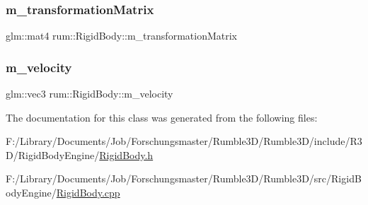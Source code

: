 \mbox{\label{classrum_1_1_rigid_body_ad3a0b17141b70e55f03a713f3892100e}} 
\subsubsection{\texorpdfstring{m\+\_\+transformation\+Matrix}{m\_transformationMatrix}}
{\footnotesize\ttfamily glm\+::mat4 rum\+::\+Rigid\+Body\+::m\+\_\+transformation\+Matrix\hspace{0.3cm}{\ttfamily [protected]}}

\mbox{\label{classrum_1_1_rigid_body_a48ac9b6ee9e5b953e811b9d53b5152c4}} 
\subsubsection{\texorpdfstring{m\+\_\+velocity}{m\_velocity}}
{\footnotesize\ttfamily glm\+::vec3 rum\+::\+Rigid\+Body\+::m\+\_\+velocity\hspace{0.3cm}{\ttfamily [protected]}}



The documentation for this class was generated from the following files\+:\begin{DoxyCompactItemize}
\item 
F\+:/\+Library/\+Documents/\+Job/\+Forschungsmaster/\+Rumble3\+D/\+Rumble3\+D/include/\+R3\+D/\+Rigid\+Body\+Engine/\hyperlink{_rigid_body_8h}{Rigid\+Body.\+h}\item 
F\+:/\+Library/\+Documents/\+Job/\+Forschungsmaster/\+Rumble3\+D/\+Rumble3\+D/src/\+Rigid\+Body\+Engine/\hyperlink{_rigid_body_8cpp}{Rigid\+Body.\+cpp}\end{DoxyCompactItemize}
